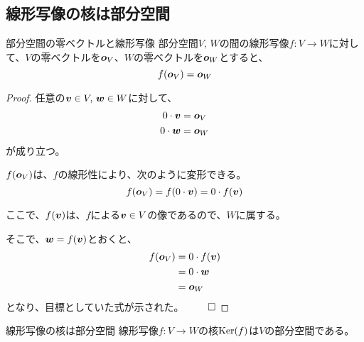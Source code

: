 \documentclass[../../../topic_linear-algebra]{subfiles}
\begin{document}
\subsection{線形写像の核は部分空間}

\begin{theorem}{部分空間の零ベクトルと線形写像}\label{thm:linear-map-zero-preserving}
  部分空間$V,\,W$の間の線形写像$f\colon V \to W$に対して、$V$の零ベクトルを$\vb*{o}_V$、$W$の零ベクトルを$\vb*{o}_W$とすると、
  \begin{equation*}
    f(\vb*{o}_V) = \vb*{o}_W
  \end{equation*}
\end{theorem}

\begin{proof}
  任意の$\vb*{v} \in V,\, \vb*{w} \in W$に対して、
  \begin{align*}
    0  \cdot \vb*{v} & = \vb*{o}_V \\
    0 \cdot \vb*{w}  & = \vb*{o}_W
  \end{align*}
  が成り立つ。

  \br

  $f(\vb*{o}_V)$は、$f$の線形性により、次のように変形できる。
  \begin{equation*}
    f(\vb*{o}_V) = f(0 \cdot \vb*{v}) = 0 \cdot f(\vb*{v})
  \end{equation*}

  ここで、$f(\vb*{v})$は、$f$による$\vb*{v} \in V$の像であるので、$W$に属する。

  そこで、$\vb*{w} = f(\vb*{v})$とおくと、
  \begin{align*}
    f(\vb*{o}_V) & = 0 \cdot f(\vb*{v}) \\
                 & = 0 \cdot \vb*{w}    \\
                 & = \vb*{o}_W
  \end{align*}
  となり、目標としていた式が示された。 $\qed$
\end{proof}


\begin{theorem}{線形写像の核は部分空間}
  線形写像$f\colon V \to W$の核$\operatorname{Ker}(f)$は$V$の部分空間である。
\end{theorem}
\end{document}
